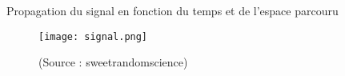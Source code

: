 \documentclass[pdf]{beamer}
\begin{document}
\begin{frame}{Propagation du signal en fonction du temps et de l'espace parcouru}
	\begin{figure}[ht!]
    \centering
    \texttt{[image: signal.png]}
		\caption{(Source : sweetrandomscience)}
	\end{figure}
\end{frame}

\end{document}
